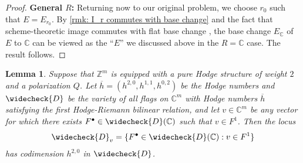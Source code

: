 \documentclass[letter, 11pt]{article}
\theoremstyle{plain}
\newtheorem{lemma}[subsubsection]{Lemma}
\theoremstyle{definition}
\newcommand{\IC}{\mathbb{C}}
\newcommand{\IZ}{\mathbb{Z}}
\newcommand{\che}[1]{\widecheck{#1}}
\newcommand{\<}{\langle}
\renewcommand{\>}{\rangle}
\newcommand{\sI}{\mathcal{I}}
\newcommand{\sJ}{\mathcal{J}}
\newcommand{\sS}{\mathcal{S}}
\newcommand{\pr}{\mathrm{pr}}
\newcommand{\mpr}{}
\begin{document}
\begin{proof}

\vspace{0.5em}


\noindent \textbf{General $R$:} Returning now to our original problem, we choose $r_{0}$ such that $E = E_{r_{0}}$. By \ref{rmk: I_r commutes with base change} and the fact that scheme-theoretic image commutes with flat base change \cite[Tag~081I]{stacks-project}, the base change $E_\IC$ of $E$ to $\IC$ can be viewed as the ``$E$'' we discussed above in the $R = \IC$ case. The result follows. \end{proof}

\begin{lemma}
\label{h20estimatelem}
Suppose that $\IZ^m$ is equipped with a pure Hodge structure of weight $2$ and a polarization $Q$. Let $\overline{h} = (h^{2,0}, h^{1,1}, h^{0,2})$ be the Hodge numbers and $\che{D}$ be the variety of all flags on $\IC^{m}$ with Hodge numbers $\overline{h}$ satisfying the first Hodge-Riemann bilinear relation, and let $v \in \IC^{m}$ be any vector for which there exists $F^{\bullet} \in \che{D}(\IC)$ such that $v \in F^{1}$. Then the locus
\[ \che{D}_{v} = \{ F^{\bullet} \in \che{D}(\IC) : v \in F^{1} \} \]
has codimension $h^{2,0}$ in $\che{D}$.
\end{lemma}
\end{document}
